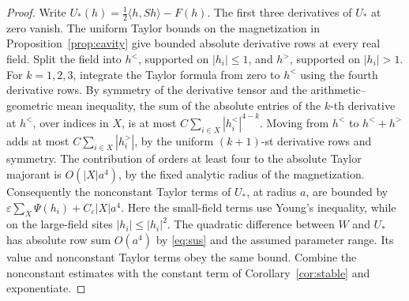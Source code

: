 \documentclass[11pt]{article}
\begin{document}
\begin{proof}
Write \(U_*(h)=\frac12\langle h,Sh\rangle-F(h)\).
The first three derivatives of \(U_*\) at zero vanish.
The uniform Taylor bounds on the magnetization in
Proposition~\ref{prop:cavity} give bounded absolute derivative rows
at every real field. Split the field into \(h^{<}\), supported on
\(|h_i|\le1\), and \(h^{>}\), supported on \(|h_i|>1\).
For \(k=1,2,3\), integrate the Taylor formula from zero to \(h^{<}\)
using the fourth derivative rows. By symmetry of the derivative
tensor and the arithmetic--geometric mean inequality, the sum
of the absolute entries of the \(k\)-th derivative at \(h^{<}\),
over indices in \(X\), is at most
\(C\sum_{i\in X}|h_i^{<}|^{4-k}\).
Moving from \(h^{<}\) to \(h^{<}+h^{>}\) adds at most
\(C\sum_{i\in X}|h_i^{>}|\), by the uniform \((k+1)\)-st derivative
rows and symmetry. The contribution of orders at least four
to the absolute Taylor majorant is \(O(|X|a^4)\), by the fixed
analytic radius of the magnetization. Consequently the
nonconstant Taylor terms of \(U_*\), at radius \(a\), are bounded
by \(\varepsilon\sum_X\Psi(h_i)+C_\varepsilon|X|a^4\).
Here the small-field terms use Young's inequality, while on
the large-field sites \(|h_i|\le |h_i|^2\).
The quadratic difference between \(W\) and \(U_*\) has absolute
row sum \(O(a^4)\) by \eqref{eq:sus} and the assumed parameter range.
Its value and nonconstant Taylor terms obey the same bound.
Combine the nonconstant estimates with the constant term of
Corollary~\ref{cor:stable} and exponentiate.
\end{proof}
\end{document}
